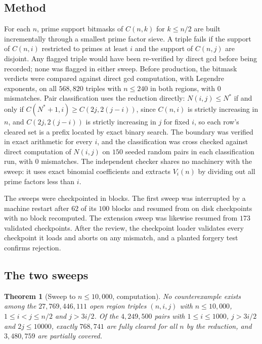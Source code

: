 \documentclass[11pt]{article}
\newtheorem{theorem}{Theorem}[section]
\theoremstyle{remark}
\begin{document}
\subsection{Method}

For each $n$, prime support bitmasks of $C(n,k)$ for $k\le n/2$ are built incrementally through a smallest prime factor sieve. A triple fails if the support of $C(n,i)$ restricted to primes at least $i$ and the support of $C(n,j)$ are disjoint. Any flagged triple would have been re-verified by direct gcd before being recorded; none was flagged in either sweep. Before production, the bitmask verdicts were compared against direct gcd computation, with Legendre exponents, on all $568{,}820$ triples with $n\le 240$ in both regions, with $0$ mismatches. Pair classification uses the reduction directly: $N(i,j)\le N^*$ if and only if $C(N^*+1,i)\ge C(2j,2(j-i))$, since $C(n,i)$ is strictly increasing in $n$, and $C(2j,2(j-i))$ is strictly increasing in $j$ for fixed $i$, so each row's cleared set is a prefix located by exact binary search. The boundary was verified in exact arithmetic for every $i$, and the classification was cross checked against direct computation of $N(i,j)$ on $150$ seeded random pairs in each classification run, with $0$ mismatches. The independent checker shares no machinery with the sweep: it uses exact binomial coefficients and extracts $V_i(n)$ by dividing out all prime factors less than $i$.

The sweeps were checkpointed in blocks. The first sweep was interrupted by a machine restart after $62$ of its $100$ blocks and resumed from on disk checkpoints with no block recomputed. The extension sweep was likewise resumed from $173$ validated checkpoints. After the review, the checkpoint loader validates every checkpoint it loads and aborts on any mismatch, and a planted forgery test confirms rejection.

\subsection{The two sweeps}

\begin{theorem}[Sweep to $n\le 10{,}000$, computation]
\label{thm:sweep1}
No counterexample exists among the $27{,}769{,}446{,}111$ open region triples $(n,i,j)$ with $n\le 10{,}000$, $1\le i<j\le n/2$ and $j>3i/2$. Of the $4{,}249{,}500$ pairs with $1\le i\le 1000$, $j>3i/2$ and $2j\le 10000$, exactly $768{,}741$ are fully cleared for all $n$ by the reduction, and $3{,}480{,}759$ are partially covered.
\end{theorem}
\end{document}

